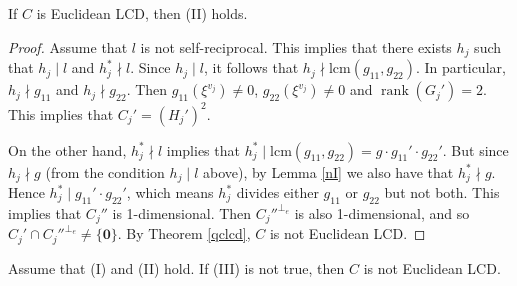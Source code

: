 \documentclass[a4paper,12pt]{article}
\DeclareMathOperator{\rank}{rank}
\begin{document}
\begin{lemma} \label{nII}   If $C$ is Euclidean LCD, then  (II) holds. 
\end{lemma}
\begin{proof} Assume that  $l$ is not self-reciprocal. This implies that there exists $h_j$ such that $h_j\mid l$ and  $h_j^*  \nmid l$.  Since $h_j \mid l$, it follows that $h_j \nmid \text{lcm}(g_{11},g_{22})$. In particular, $h_j\nmid g_{11}$ and $h_j\nmid g_{22}$. Then    $g_{11}(\xi^{v_j}) \ne 0$, $g_{22}(\xi^{v_j}) \ne 0$ and $\rank(G_j')=2$.
This implies that  $C_j'=(H_j')^2.$ 

On the other hand, $h_j^* \nmid l$ implies that $h_j^* \mid \text{lcm}(g_{11},g_{22}) = g \cdot g_{11}' \cdot g_{22}'$. But since $h_j \nmid g$ (from the condition $h_j \mid l$ above), by Lemma \ref{nI} we also have that $h_j^* \nmid g$. Hence $h_j^* \mid g_{11}'\cdot g_{22}'$, which means $h_j^*$ divides  either  $g_{11}$  or $g_{22}$ but not both. This implies that $C_j''$ is 1-dimensional. Then $C_j''^{\perp_e}$ is also 1-dimensional, and so $C_j' \cap C_j''^{\perp_e} \ne \{ \mathbf{0} \}$.  By Theorem \ref{qclcd}, $C$ is not Euclidean LCD.
\end{proof}

\begin{lemma} \label{nIII} Assume that (I) and (II) hold. If (III) is not true, then $C$ is not Euclidean LCD. 
\end{lemma}
\end{document}
